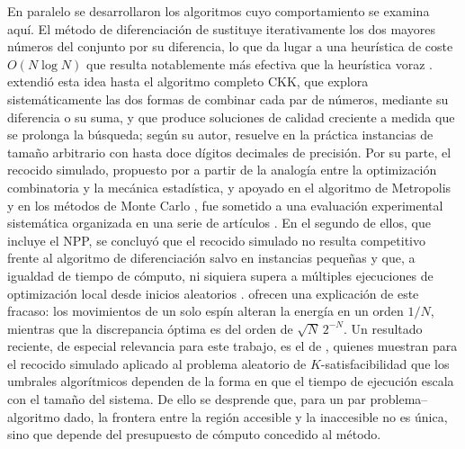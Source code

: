 En paralelo se desarrollaron los algoritmos cuyo comportamiento se examina aquí. El método de diferenciación de \textcite{karmarkar1982} sustituye iterativamente los dos mayores números del conjunto por su diferencia, lo que da lugar a una heurística de coste $O(N \log N)$ \parencite{mertens2001,korf1998} que resulta notablemente más efectiva que la heurística voraz \parencite{korf1998,gent1998}. \textcite{korf1998} extendió esta idea hasta el algoritmo completo CKK, que explora sistemáticamente las dos formas de combinar cada par de números, mediante su diferencia o su suma, y que produce soluciones de calidad creciente a medida que se prolonga la búsqueda; según su autor, resuelve en la práctica instancias de tamaño arbitrario con hasta doce dígitos decimales de precisión. Por su parte, el recocido simulado, propuesto por \textcite{kirkpatrick1983} a partir de la analogía entre la optimización combinatoria y la mecánica estadística, y apoyado en el algoritmo de Metropolis y en los métodos de Monte Carlo \parencite{newman1999}, fue sometido a una evaluación experimental sistemática organizada en una serie de artículos \parencite{johnson1989,johnson1991}. En el segundo de ellos, que incluye el NPP, se concluyó que el recocido simulado no resulta competitivo frente al algoritmo de diferenciación salvo en instancias pequeñas y que, a igualdad de tiempo de cómputo, ni siquiera supera a múltiples ejecuciones de optimización local desde inicios aleatorios \parencite{johnson1991}. \textcite{ferreira1998} ofrecen una explicación de este fracaso: los movimientos de un solo espín alteran la energía en un orden $1/N$, mientras que la discrepancia óptima es del orden de $\sqrt{N}\,2^{-N}$. Un resultado reciente, de especial relevancia para este trabajo, es el de \textcite{angelini2026}, quienes muestran para el recocido simulado aplicado al problema aleatorio de $K$-satisfacibilidad que los umbrales algorítmicos dependen de la forma en que el tiempo de ejecución escala con el tamaño del sistema. De ello se desprende que, para un par problema--algoritmo dado, la frontera entre la región accesible y la inaccesible no es única, sino que depende del presupuesto de cómputo concedido al método.

